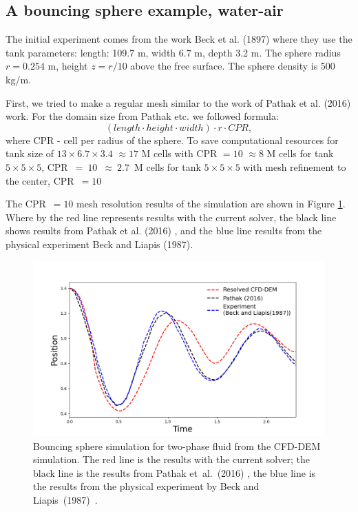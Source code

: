 \subsection{A bouncing sphere example, water-air}
The initial experiment comes from the work Beck et al. (1897) \cite{beck1987transient} where they use the tank parameters: length: 109.7 m, width 6.7 m, depth 3.2 m. The sphere radius $r= 0.254$ m, height $z = r/10$ above the free surface. The sphere density is 500 kg/m.

First, we tried to make a regular mesh similar to the work of Pathak et al. (2016) \cite{pathak20163d} work. For the domain size from Pathak etc.\cite{pathak20163d} we followed formula:
\begin{equation}
    (length \cdot height \cdot width)  \cdot  r  \cdot  CPR,
\end{equation}
where CPR - cell per radius of the sphere. To save computational resources for tank size of $13\times 6.7 \times 3.4$ $\approx 17$ M cells with CPR $= 10$ $\approx 8$ M cells for tank $5\times 5 \times 5$, CPR~$=~10$~$\approx~2.7$~M cells for tank $5\times 5 \times 5$ with mesh refinement to the center, CPR~$= 10$

The CPR~$= 10$ mesh resolution results of the simulation are shown in Figure \ref{fig:2ph_exp}. Where by the red line represents results with the current solver, the black line shows results from Pathak et al. (2016) \cite{pathak20163d}, and the blue line results from the physical experiment Beck and Liapis (1987)\cite{beck1987transient}.
\begin{figure}[!ht]
    \centering
    \includegraphics[width=15cm]{Images/chap3/bouncing_sphere_plot.png}
    \caption{Bouncing sphere simulation for two-phase fluid from the CFD-DEM simulation. The red line is the results with the current solver; the black line is the results from Pathak et~al.~(2016) \cite{pathak20163d}, the blue line is the results from the physical experiment by Beck and Liapis~(1987)~\cite{beck1987transient}.}
    \label{fig:2ph_exp}
    \end{figure}
    
